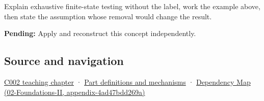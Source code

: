 Explain exhaustive finite-state testing without the label, work the example above, then state the assumption whose removal would change the result.

\textbf{Pending:} Apply and reconstruct this concept independently.

\subsection{Source and navigation}\label{appendix-05db24ccc28a-source-and-navigation}

\hyperref[01-foundations-i-ch001-arithmetic-becomes-a-policy]{C002 teaching chapter} · \hyperref[appendix-fd090d982a15]{Part definitions and mechanisms} · \href{../02-Foundations-II/main.pdf\#nameddest=appendix-4ad47bdd269a}{Dependency Map (02-Foundations-II, appendix-4ad47bdd269a)}
